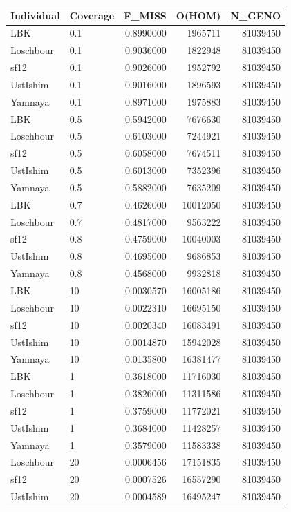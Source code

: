 {\begin{table}
\begin{tabular}[t]{llrrr}
\toprule
Individual & Coverage & F\_MISS & O(HOM) & N\_GENO\\
\midrule
LBK & 0.1 & 0.8990000 & 1965711 & 81039450\\
Loschbour & 0.1 & 0.9036000 & 1822948 & 81039450\\
sf12 & 0.1 & 0.9026000 & 1952792 & 81039450\\
UstIshim & 0.1 & 0.9016000 & 1896593 & 81039450\\
Yamnaya & 0.1 & 0.8971000 & 1975883 & 81039450\\
LBK & 0.5 & 0.5942000 & 7676630 & 81039450\\
Loschbour & 0.5 & 0.6103000 & 7244921 & 81039450\\
sf12 & 0.5 & 0.6058000 & 7674511 & 81039450\\
UstIshim & 0.5 & 0.6013000 & 7352396 & 81039450\\
Yamnaya & 0.5 & 0.5882000 & 7635209 & 81039450\\
LBK & 0.7 & 0.4626000 & 10012050 & 81039450\\
Loschbour & 0.7 & 0.4817000 & 9563222 & 81039450\\
sf12 & 0.8 & 0.4759000 & 10040003 & 81039450\\
UstIshim & 0.8 & 0.4695000 & 9686853 & 81039450\\
Yamnaya & 0.8 & 0.4568000 & 9932818 & 81039450\\
LBK & 10 & 0.0030570 & 16005186 & 81039450\\
Loschbour & 10 & 0.0022310 & 16695150 & 81039450\\
sf12 & 10 & 0.0020340 & 16083491 & 81039450\\
UstIshim & 10 & 0.0014870 & 15942028 & 81039450\\
Yamnaya & 10 & 0.0135800 & 16381477 & 81039450\\
LBK & 1 & 0.3618000 & 11716030 & 81039450\\
Loschbour & 1 & 0.3826000 & 11311586 & 81039450\\
sf12 & 1 & 0.3759000 & 11772021 & 81039450\\
UstIshim & 1 & 0.3684000 & 11428257 & 81039450\\
Yamnaya & 1 & 0.3579000 & 11583338 & 81039450\\
Loschbour & 20 & 0.0006456 & 17151835 & 81039450\\
sf12 & 20 & 0.0007526 & 16557290 & 81039450\\
UstIshim & 20 & 0.0004589 & 16495247 & 81039450\\

\end{tabular}
\end{table}}
